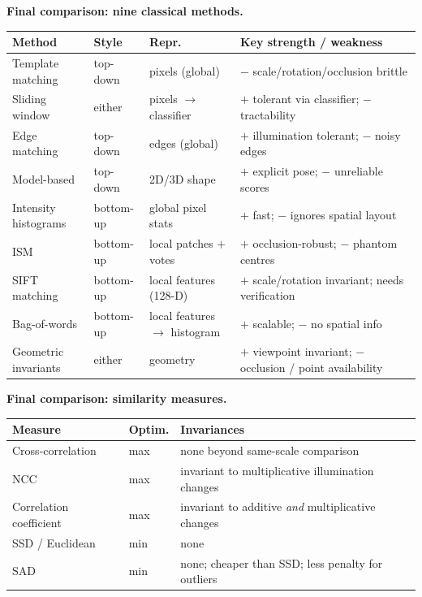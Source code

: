 \textbf{Final comparison: nine classical methods.}

\begin{center}
\renewcommand{\arraystretch}{1.3}
\begin{tabular}{@{} l l l p{4.5cm} @{}}
\toprule
\textbf{Method} & \textbf{Style} & \textbf{Repr.} & \textbf{Key strength / weakness} \\
\midrule
Template matching & top-down & pixels (global) & $-$ scale/rotation/occlusion brittle \\
Sliding window & either & pixels $\to$ classifier & $+$ tolerant via classifier; $-$ tractability \\
Edge matching & top-down & edges (global) & $+$ illumination tolerant; $-$ noisy edges \\
Model-based & top-down & 2D/3D shape & $+$ explicit pose; $-$ unreliable scores \\
Intensity histograms & bottom-up & global pixel stats & $+$ fast; $-$ ignores spatial layout \\
ISM & bottom-up & local patches $+$ votes & $+$ occlusion-robust; $-$ phantom centres \\
SIFT matching & bottom-up & local features (128-D) & $+$ scale/rotation invariant; needs verification \\
Bag-of-words & bottom-up & local features $\to$ histogram & $+$ scalable; $-$ no spatial info \\
Geometric invariants & either & geometry & $+$ viewpoint invariant; $-$ occlusion / point availability \\
\bottomrule
\end{tabular}
\end{center}

\textbf{Final comparison: similarity measures.}

\begin{center}
\renewcommand{\arraystretch}{1.3}
\begin{tabular}{@{} l l p{6cm} @{}}
\toprule
\textbf{Measure} & \textbf{Optim.} & \textbf{Invariances} \\
\midrule
Cross-correlation & max & none beyond same-scale comparison \\
NCC & max & invariant to multiplicative illumination changes \\
Correlation coefficient & max & invariant to additive \emph{and} multiplicative changes \\
SSD / Euclidean & min & none \\
SAD & min & none; cheaper than SSD; less penalty for outliers \\
\bottomrule
\end{tabular}
\end{center}
